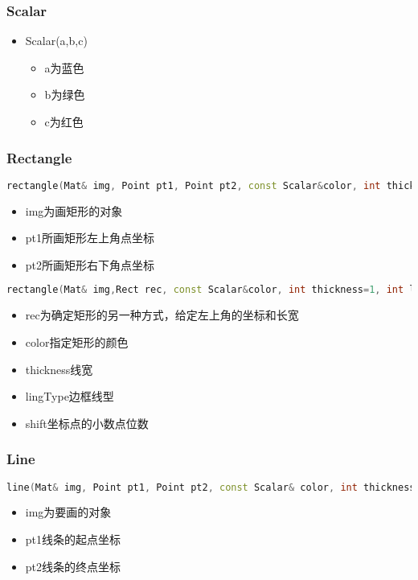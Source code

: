 \documentclass[12pt]{article}
\begin{document}
\subsubsection{Scalar}
\begin{itemize}
\item Scalar(a,b,c)
	\begin{itemize}
	\item a为蓝色
	\item b为绿色
	\item c为红色
	\end{itemize}
\end{itemize}

\subsubsection{Rectangle}
\begin{lstlisting}[language=c++]
rectangle(Mat& img, Point pt1, Point pt2, const Scalar&color, int thickness=1,int lineType=8, int shift=0)
\end{lstlisting}
	\begin{itemize}
	\item img为画矩形的对象
	\item pt1所画矩形左上角点坐标
	\item pt2所画矩形右下角点坐标
	\end{itemize}
\begin{lstlisting}[language=c++]
rectangle(Mat& img,Rect rec, const Scalar&color, int thickness=1, int lineType=8,int shift=0 )
\end{lstlisting}
	\begin{itemize}
	\item rec为确定矩形的另一种方式，给定左上角的坐标和长宽
	\item color指定矩形的颜色
	\item thickness线宽
	\item lingType边框线型
	\item shift坐标点的小数点位数
	\end{itemize}

\subsubsection{Line}
\begin{lstlisting}[language=c++]
line(Mat& img, Point pt1, Point pt2, const Scalar& color, int thickness=1, int lineType=8, int shift=0)
\end{lstlisting}
	\begin{itemize}
	\item img为要画的对象
	\item pt1线条的起点坐标
	\item pt2线条的终点坐标
	\end{itemize}
\end{document}
